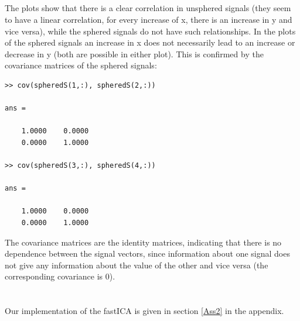 \documentclass[10pt]{article}
\begin{document}
\subsection{}
The plots show that there is a clear correlation in unsphered signals (they seem to have a linear correlation, for every increase of x, there is an increase in y and vice versa), while the sphered signals do not have such relationships. In the plots of the sphered signals an increase in x does not necessarily lead to an increase or decrease in y (both are possible in either plot).
This is confirmed by the covariance matrices of the sphered signals:
\begin{lstlisting}
>> cov(spheredS(1,:), spheredS(2,:))

ans =

    1.0000    0.0000
    0.0000    1.0000

>> cov(spheredS(3,:), spheredS(4,:))

ans =

    1.0000    0.0000
    0.0000    1.0000
\end{lstlisting}
The covariance matrices are the identity matrices, indicating that there is no dependence between the signal vectors, since information about one signal does not give any information about the value of the other and vice versa (the corresponding covariance is 0).

\section{}
Our implementation of the fastICA is given in section \ref{Ass2} in the appendix.

\subsection{}
\end{document}
